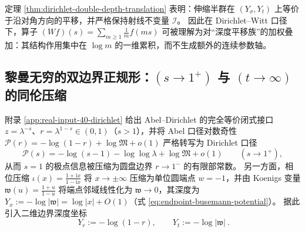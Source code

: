 \begin{remark}
定理 \ref{thm:dirichlet-double-depth-translation} 表明：伸缩半群在 \((Y_{\sigma},Y_t)\) 上等价于沿对角方向的平移，并严格保持射线不变量 \(\mathcal{I}\)。
因此在 Dirichlet--Witt 口径下，算子
\(
(Wf)(s)=\sum_{m\ge 1}\frac{1}{m}f(ms)
\)
可被理解为对“深度平移族”的加权叠加：其结构作用集中在 \(\log m\) 的一维累积，而不生成额外的连续参数轴。
\end{remark}

\subsection{黎曼无穷的双边界正规形：\texorpdfstring{$(s\to 1^{+})$}{(s->1+)} 与 \texorpdfstring{$(t\to\infty)$}{(t->infty)} 的同伦压缩}\label{subsec:riemann-infinity-dual-boundary}
附录 \ref{app:real-input-40-dirichlet} 给出 Abel--Dirichlet 的完全等价闭式接口 \(z=\lambda^{-s}\)、\(r=\lambda^{1-s}\in(0,1)\)（\(s>1\)），并将 Abel 口径对数奇性 \(\mathcal{P}(r)=-\log(1-r)+\log\mathfrak{M}+o(1)\) 严格转写为 Dirichlet 口径
\[
\mathcal{P}(s)=-\log(s-1)-\log\log\lambda+\log\mathfrak{M}+o(1)\qquad(s\to 1^{+}),
\]
从而 \(s=1\) 的极点信息被压缩为圆盘边界 \(r\to 1^{-}\) 的有限部常数。
另一方面，相位压缩 \(\iota(x)=\frac{1+\mathrm{i}x}{1-\mathrm{i}x}\) 将 \(x\to\pm\infty\) 压缩为单位圆端点 \(w=-1\)，并由 Koenigs 变量 \(\mathfrak{w}(u)=\frac{1+u}{1-u}\) 将端点邻域线性化为 \(\mathfrak{w}\to 0\)，其深度为 \(Y_x:=-\log|\mathfrak{w}|=\log|x|+O(1)\)（式 \eqref{eq:endpoint-busemann-potential}）。
据此引入二维边界深度坐标
\begin{equation}\label{eq:dual-boundary-depth-coords}
\boxed{\ Y_r:=-\log(1-r),\qquad Y_t:=-\log|\mathfrak{w}|\ }.
\end{equation}

